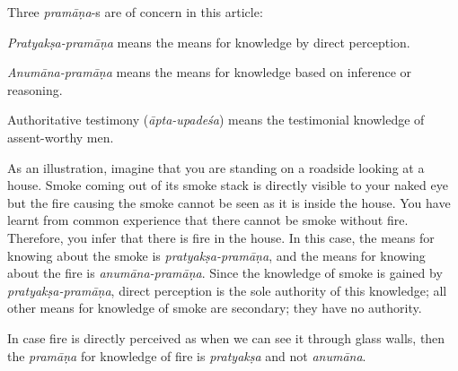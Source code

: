 Three {\sl pramāṇa}-s are of concern in this article:
\begin{myquote}
{{\sl Pratyakṣa-pramāṇa}} means the means for knowledge by direct perception. 

{{\sl Anumāna-pramāṇa}} means the means for knowledge based on inference or reasoning.  

Authoritative testimony {({\sl āpta-upadeśa})} means the testimonial knowledge of assent-worthy men.
\end{myquote}

As an illustration, imagine that you are standing on a roadside looking at a house. Smoke coming out of its smoke stack is directly visible to your naked eye but the fire causing the smoke cannot be seen as it is inside the house.  You have learnt from common experience that there cannot be smoke without fire.  Therefore, you infer that there is fire in the house.  In this case, the means for knowing about the smoke is {\sl pratyakṣa-pramāṇa}, and the means for knowing about the fire is {\sl anumāna-pramāṇa}.  Since the knowledge of smoke is gained by {\sl pratyakṣa-pramāṇa}, direct perception is the sole authority of this knowledge; all other means for knowledge of smoke are secondary; they have no authority.  

In case fire is directly perceived as when we can see it through glass walls, then the {\sl pramāṇa} for knowledge of fire is {\sl pratyakṣa} and not {\sl anumāna}.  

